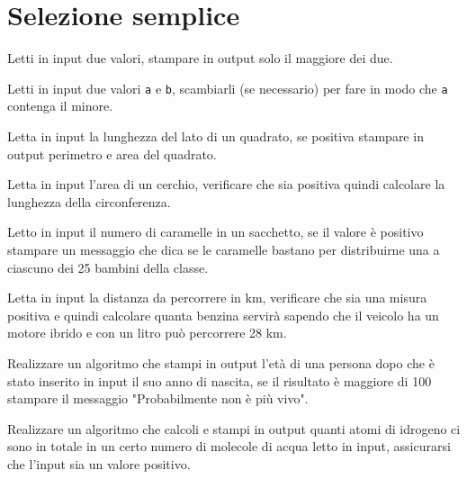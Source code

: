 \section{Selezione semplice}

\begin{exercise}
	Letti in input due valori, stampare in output solo il maggiore dei due.
\end{exercise}

\begin{exercise}
	Letti in input due valori \texttt{a} e \texttt{b}, scambiarli (se necessario) per fare in modo che \texttt{a} contenga il minore.
\end{exercise}

\begin{exercise}
	Letta in input la lunghezza del lato di un quadrato, se positiva stampare in output perimetro e area del quadrato.
\end{exercise}

\begin{exercise}
	Letta in input l'area di un cerchio, verificare che sia positiva quindi calcolare la lunghezza della circonferenza.
\end{exercise}

\begin{exercise}
	Letto in input il numero di caramelle in un sacchetto, se il valore è positivo stampare un messaggio che dica se le caramelle bastano per distribuirne una a ciascuno dei 25 bambini della classe.
\end{exercise}

\begin{exercise}
	Letta in input la distanza da percorrere in km, verificare che sia una misura positiva e quindi calcolare quanta benzina servirà sapendo che il veicolo ha un motore ibrido e con un litro può percorrere 28 km.
\end{exercise}

\begin{exercise}
	Realizzare un algoritmo che stampi in output l’età di una persona dopo che è stato inserito in input il suo anno di nascita, se il risultato è maggiore di 100 stampare il messaggio "Probabilmente non è più vivo".
\end{exercise}

\begin{exercise}
	Realizzare un algoritmo che calcoli e stampi in output quanti atomi di idrogeno ci sono in totale in un certo numero di molecole di acqua letto in input, assicurarsi che l'input sia un valore positivo.
\end{exercise}

